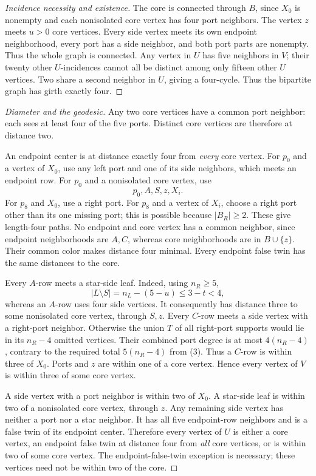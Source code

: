 \documentclass[11pt]{article}
\begin{document}
\begin{proof}[Incidence necessity and existence]
The core is connected through $B$, since $X_0$ is nonempty and
each nonisolated core vertex has four port neighbors. The vertex
$z$ meets $u>0$ core vertices. Every side vertex meets its own
endpoint neighborhood, every port has a side neighbor, and both
port parts are nonempty. Thus the whole graph is connected.
Any vertex in $U$ has five neighbors in $V$; their twenty other
$U$-incidences cannot all be distinct among only fifteen other
$U$ vertices. Two share a second neighbor in $U$, giving a
four-cycle. Thus the bipartite graph has girth exactly four.
\end{proof}

\begin{proof}[Diameter and the geodesic]
Any two core vertices have a common port neighbor: each sees at
least four of the five ports. Distinct core vertices are therefore
at distance two.

An endpoint center is at distance exactly four from \emph{every}
core vertex. For $p_0$ and a vertex of $X_0$, use any left port
and one of its side neighbors, which meets an endpoint row. For
$p_0$ and a nonisolated core vertex, use
\[
 p_0,A,S,z,X_i.
\]
For $p_8$ and $X_0$, use a right port. For $p_8$ and a vertex of
$X_i$, choose a right port other than its one missing port; this
is possible because $|B_R|\geq2$. These give length-four paths.
No endpoint and core vertex has a common neighbor, since endpoint
neighborhoods are $A,C$, whereas core neighborhoods are in
$B\cup\{z\}$. Their common color makes distance four minimal.
Every endpoint false twin has the same distances to the core.

Every $A$-row meets a star-side leaf. Indeed, using $n_R\geq5$,
\[
 |L\setminus S|=n_L-(5-u)\leq3-t<4,
\]
whereas an $A$-row uses four side vertices. It consequently has
distance three to some nonisolated core vertex, through $S,z$.
Every $C$-row meets a side vertex with a right-port neighbor.
Otherwise the union $T$ of all right-port supports would lie in
its $n_R-4$ omitted vertices. Their combined port degree is at
most $4(n_R-4)$, contrary to the required total $5(n_R-4)$ from
(3). Thus a $C$-row is within three of $X_0$. Ports and $z$ are
within one of a core vertex. Hence every vertex of $V$ is within
three of some core vertex.

A side vertex with a port neighbor is within two of $X_0$.
A star-side leaf is within two of a nonisolated core vertex,
through $z$. Any remaining side vertex has neither a port nor a
star neighbor. It has all five endpoint-row neighbors and is a
false twin of its endpoint center. Therefore every vertex of $U$
is either a core vertex, an endpoint false twin at distance four
from \emph{all} core vertices, or is within two of some core vertex.
The endpoint-false-twin exception is necessary; these vertices
need not be within two of the core.


\end{proof}
\end{document}
